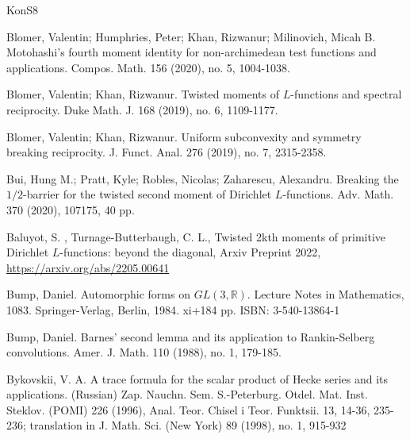 \documentclass[11pt,reqno]{amsart}
\theoremstyle{definition}
\theoremstyle{definition}
\theoremstyle{remark}
\newcommand{\R}{\ensuremath{\mathbb{R}}}
\numberwithin{equation}{section}
\begin{document}
\begin{thebibliography}{KonS8}
	 	 
	 	  Blomer, Valentin; Humphries, Peter; Khan, Rizwanur; Milinovich, Micah B. Motohashi's fourth moment identity for non-archimedean test functions and applications. Compos. Math. 156 (2020), no. 5, 1004-1038. 
	 	  
	 	  
	 	  
	 	  
 


		
	Blomer, Valentin;   Khan, Rizwanur.   Twisted moments of $L$-functions and spectral reciprocity. Duke Math. J. 168 (2019), no. 6, 1109-1177.
	
	Blomer, Valentin;  Khan, Rizwanur.  Uniform subconvexity and symmetry breaking reciprocity. J. Funct. Anal. 276 (2019), no. 7, 2315-2358.
	


	

	
	Bui, Hung M.; Pratt, Kyle; Robles, Nicolas; Zaharescu, Alexandru. Breaking the $1/2$-barrier for the twisted second moment of Dirichlet $L$-functions. Adv. Math. 370 (2020), 107175, 40 pp.
	
	Baluyot, S. ,  Turnage-Butterbaugh, C. L., Twisted 2kth moments of primitive Dirichlet $L$-functions: beyond the diagonal, Arxiv Preprint 2022, 
	\url{https://arxiv.org/abs/2205.00641}
	
	

Bump, Daniel. Automorphic forms on $GL(3,\R)$. Lecture Notes in Mathematics, 1083. Springer-Verlag, Berlin, 1984.  xi+184 pp. ISBN: 3-540-13864-1
	
	 Bump, Daniel. Barnes' second lemma and its application to Rankin-Selberg convolutions. Amer. J. Math. 110 (1988), no. 1, 179-185.	
	 
	  Bykovskii, V. A. A trace formula for the scalar product of Hecke series and its applications. (Russian) Zap. Nauchn. Sem. S.-Peterburg. Otdel. Mat. Inst. Steklov. (POMI) 226 (1996), Anal. Teor. Chisel i Teor. Funktsii. 13, 14-36, 235-236; translation in J. Math. Sci. (New York) 89 (1998), no. 1, 915-932 
	 

\end{thebibliography}
\end{document}
